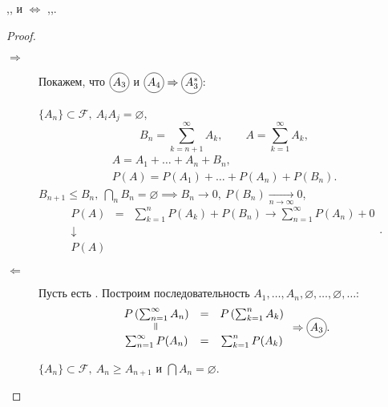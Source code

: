 \begin{theorem}
    ,, и  $\iff$ ,,.
\end{theorem}

\begin{proof}\leavevmode
  \begin{description}
      \item[$\boxed{\Rightarrow}$] Покажем, что $\circled{$A_3$}$ и $\circled{$A_4$} \implies \circled{$A_3^*$}$:

      $\{A_n\}\subset \mathcal{F}, \ A_iA_j = \varnothing$,
      \[
          B_n = \sum_{k=n+1}^{\infty }A_k, \qquad A = \sum_{k=1}^{\infty }A_k,
      \]
      \[
          \begin{array}{c}
            A = A_1 + \ldots + A_n + B_n, \\
            P(A) = P(A_1) + \ldots + P(A_n) + P(B_n).
          \end{array}
      \]
      $B_{n+1} \leqslant B_n, \ \bigcap_{n}B_n = \varnothing \implies B_n \rightarrow 0, \ P(B_n) \xrightarrow[n \rightarrow \infty ]{} 0$,
      \[
          \begin{array}{ccc}
              P(A) & = & \sum_{k=1}^{n}P(A_k) + P(B_n) \rightarrow \sum_{n=1}^{\infty }P(A_n) + 0 \\
              \downarrow & & \\
              P(A) & & 
          \end{array}.
      \]

      \item[$\boxed{\Leftarrow}$] Пусть есть . Построим последовательность $A_1,\ldots,A_n,\varnothing,\ldots,\varnothing,\ldots$:
      \[
          \begin{array}{ccc}
              P \left(\sum_{n=1}^{\infty }A_n\right) & = & P \left(\sum_{k=1}^{n}A_k\right) \\
              \verteq & & \\
              \sum_{n=1}^{\infty }P(A_n) & = & \sum_{k=1}^{n}P(A_k)
          \end{array} \implies \circled{$A_3$}.
      \]
    \begin{figure}[H]
      \centering
      \label{fig:fig-2}
    \end{figure}

      $\{A_n\} \subset \mathcal{F}, \ A_n \geqslant A_{n+1}$ и $\bigcap A_n = \varnothing $.


\end{description}
\end{proof}
